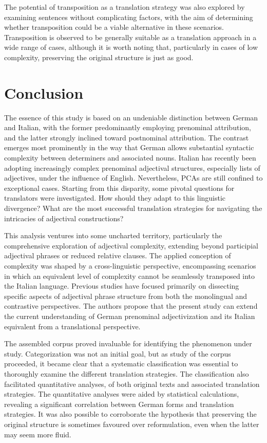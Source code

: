 \documentclass[output=paper,colorlinks,citecolor=brown]{langscibook}
\begin{document}
The potential of transposition as a translation strategy was also explored by examining sentences without complicating factors, with the aim of determining whether transposition could be a viable alternative in these scenarios. Transposition is observed to be generally suitable as a translation approach in a wide range of cases, although it is worth noting that, particularly in cases of low complexity, preserving the original structure is just as good.

\section{Conclusion}\label{sec:resi:6}

The essence of this study is based on an undeniable distinction between German and Italian, with the former predominantly employing prenominal attribution, and the latter strongly inclined toward postnominal attribution. The contrast emerges most prominently in the way that German allows substantial syntactic complexity between determiners and associated nouns. Italian has recently been adopting increasingly complex prenominal adjectival structures, especially lists of adjectives, under the influence of English. Nevertheless, PCAs are still confined to exceptional cases. Starting from this disparity, some pivotal questions for translators were investigated. How should they adapt to this linguistic divergence? What are the most successful translation strategies for navigating the intricacies of adjectival constructions?

This analysis ventures into some uncharted territory, particularly the comprehensive exploration of adjectival complexity, extending beyond participial adjectival phrases or reduced relative clauses. The applied conception of complexity was shaped by a cross-linguistic perspective, encompassing scenarios in which an equivalent level of complexity cannot be seamlessly transposed into the Italian language. Previous studies have focused primarily on dissecting specific aspects of adjectival phrase structure from both the monolingual and contrastive perspectives. The authors propose that the present study can extend the current understanding of German prenominal adjectivization and its Italian equivalent from a translational perspective.

The assembled corpus proved invaluable for identifying the phenomenon under study. Categorization was not an initial goal, but as study of the corpus proceeded, it became clear that a systematic classification was essential to thoroughly examine the different translation strategies. The classification also facilitated quantitative analyses, of both original texts and associated translation strategies. The quantitative analyses were aided by statistical calculations, revealing a significant correlation between German forms and translation strategies. It was also possible to corroborate the hypothesis that preserving the original structure is sometimes favoured over reformulation, even when the latter may seem more fluid.
\end{document}
